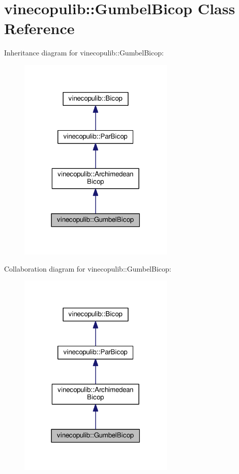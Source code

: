 \hypertarget{classvinecopulib_1_1_gumbel_bicop}{}\section{vinecopulib\+:\+:Gumbel\+Bicop Class Reference}
\label{classvinecopulib_1_1_gumbel_bicop}


Inheritance diagram for vinecopulib\+:\+:Gumbel\+Bicop\+:\nopagebreak
\begin{figure}[H]
\begin{center}
\leavevmode
\includegraphics[width=210pt]{classvinecopulib_1_1_gumbel_bicop__inherit__graph}
\end{center}
\end{figure}


Collaboration diagram for vinecopulib\+:\+:Gumbel\+Bicop\+:\nopagebreak
\begin{figure}[H]
\begin{center}
\leavevmode
\includegraphics[width=210pt]{classvinecopulib_1_1_gumbel_bicop__coll__graph}
\end{center}
\end{figure}
